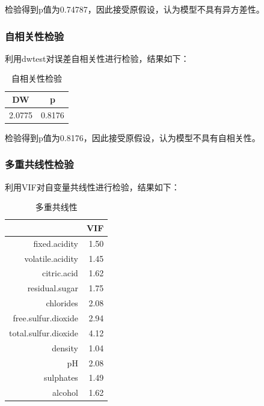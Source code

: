 \documentclass[fontset=ubuntu]{ctexart}
\begin{document}
                检验得到p值为0.74787，因此接受原假设，认为模型不具有异方差性。
               
            \subsubsection{自相关性检验}
                利用dwtest对误差自相关性进行检验，结果如下：
                \begin{table}[htbp]
                    \centering
                    \caption{自相关性检验}
                    \vspace{5pt}
                    \begin{tabular}{cc}
                        \hline
                        DW & p \\
                        \hline
                        2.0775 & 0.8176 \\
                        \hline
                    \end{tabular}
                \end{table}
                
                检验得到p值为0.8176，因此接受原假设，认为模型不具有自相关性。

            \subsubsection{多重共线性检验}
                利用VIF对自变量共线性进行检验，结果如下：
                \begin{table}[ht]
                    \centering
                    \caption{多重共线性}
                    \vspace{5pt}
                    \begin{tabular}{rr}
                        \hline
                        & VIF \\ 
                        \hline
                        fixed.acidity & 1.50 \\ 
                        volatile.acidity & 1.45 \\ 
                        citric.acid & 1.62 \\ 
                        residual.sugar & 1.75 \\ 
                        chlorides & 2.08 \\ 
                        free.sulfur.dioxide & 2.94 \\ 
                        total.sulfur.dioxide & 4.12 \\ 
                        density & 1.04 \\ 
                        pH & 2.08 \\ 
                        sulphates & 1.49 \\ 
                        alcohol & 1.62 \\ 
                        \hline
                    \end{tabular}
                \end{table}
\end{document}
